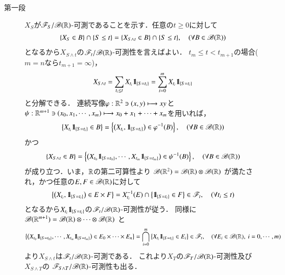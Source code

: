 	\begin{prf}\mbox{}
		\begin{description}
			\item[第一段]
				$X_S$が$\mathscr{F}_S/\mathscr{B}(\mathbb{R})$-可測であることを示す．任意の$t \geq 0$に対して
				\begin{align}
					\{X_S \in B\} \cap \{S \leq t\} = \{X_{S \wedge t} \in B\} \cap \{S \leq t\},
					\quad (\forall B \in \mathscr{B}(\mathbb{R}))
				\end{align}
				となるから$X_{S \wedge t}$の$\mathscr{F}_t/\mathscr{B}(\mathbb{R})$-可測性を言えばよい．
				$t_m \leq t < t_{m+1}$の場合($m=n$なら$t_{m+1} = \infty$)，
				\begin{align}
					X_{S \wedge t} = \sum_{t_i \leq t} X_{t_i} \mbox{1}\hspace{-0.25em}\mbox{l}_{\{S=t_i\}}
					= \sum_{i=0}^m X_{t_i} \mbox{1}\hspace{-0.25em}\mbox{l}_{\{S=t_i\}}
				\end{align}
				と分解できる．
				連続写像$\varphi:\mathbb{R}^2 \ni (x,y) \longmapsto xy$と
				$\psi:\mathbb{R}^{m+1} \ni (x_0,x_1,\cdots,x_m) \longmapsto x_0+x_1+\cdots+x_m$を用いれば，
				\begin{align}
					\left\{ X_{t_i}\mbox{1}\hspace{-0.25em}\mbox{l}_{\{S=t_i\}} \in B \right\}
					= \left\{ \left( X_{t_i}, \mbox{1}\hspace{-0.25em}\mbox{l}_{\{S=t_i\}} \right) \in \varphi^{-1}(B) \right\},
					\quad (\forall B \in \mathscr{B}(\mathbb{R}))
				\end{align}
				かつ
				\begin{align}
					\left\{ X_{S \wedge t} \in B \right\}
					= \left\{ \left( X_{t_0}\mbox{1}\hspace{-0.25em}\mbox{l}_{\{S=t_0\}},\cdots,X_{t_m}\mbox{1}\hspace{-0.25em}\mbox{l}_{\{S=t_m\}} \right) \in \psi^{-1}(B) \right\},
					\quad (\forall B \in \mathscr{B}(\mathbb{R}))
				\end{align}
				が成り立つ．いま，$\mathbb{R}$の第二可算性より
				$\mathscr{B}(\mathbb{R}^2) = \mathscr{B}(\mathbb{R}) \otimes \mathscr{B}(\mathbb{R})$
				が満たされ，かつ任意の$E,F \in \mathscr{B}(\mathbb{R})$に対して
				\begin{align}
					\left\{ \left( X_{t_i}, \mbox{1}\hspace{-0.25em}\mbox{l}_{\{S=t_i\}} \right) \in E \times F \right\}
					= X_{t_i}^{-1}(E) \cap \left\{ \mbox{1}\hspace{-0.25em}\mbox{l}_{\{S=t_i\}} \in F \right\}
					\in \mathscr{F}_t,
					\quad (\forall t_i \leq t)
				\end{align}
				となるから$X_{t_i} \mbox{1}\hspace{-0.25em}\mbox{l}_{\{S=t_i\}}$の$\mathscr{F}_t/\mathscr{B}(\mathbb{R})$-可測性が従う．
				同様に
				$\mathscr{B}(\mathbb{R}^{m+1}) = \mathscr{B}(\mathbb{R}) \otimes \cdots \otimes \mathscr{B}(\mathbb{R})$
				と
				\begin{align}
					\left\{ \left( X_{t_0}\mbox{1}\hspace{-0.25em}\mbox{l}_{\{S=t_0\}},\cdots,X_{t_m}\mbox{1}\hspace{-0.25em}\mbox{l}_{\{S=t_m\}} \right) \in E_0 \times \cdots \times E_n \right\}
					= \bigcap_{i=0}^m \left\{X_{t_i}\mbox{1}\hspace{-0.25em}\mbox{l}_{\{S=t_i\}} \in E_i\right\}
					\in \mathscr{F}_t,
					\quad (\forall E_i \in \mathscr{B}(\mathbb{R}),\ i=0,\cdots,m)
				\end{align}
				より$X_{S \wedge t}$は$\mathscr{F}_t/\mathscr{B}(\mathbb{R})$-可測である．
				これより$X_T$の$\mathscr{F}_T/\mathscr{B}(\mathbb{R})$-可測性及び$X_{S \wedge T}$の
				$\mathscr{F}_{S \wedge T}/\mathscr{B}(\mathbb{R})$-可測性も出る．
				

\end{description}
\end{prf}

